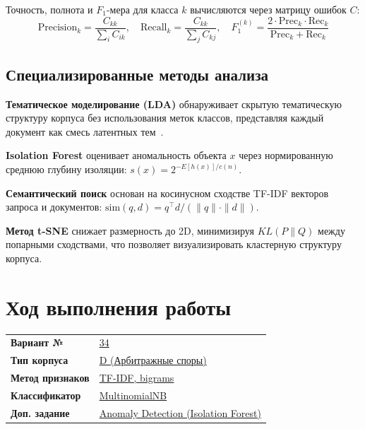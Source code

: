 \documentclass[12pt, a4paper]{report}
\begin{document}
Точность, полнота и $F_1$-мера для класса $k$ вычисляются через матрицу ошибок $C$:
\[
  \text{Precision}_k = \frac{C_{kk}}{\sum_i C_{ik}}, \quad
  \text{Recall}_k    = \frac{C_{kk}}{\sum_j C_{kj}}, \quad
  F_1^{(k)} = \frac{2 \cdot \text{Prec}_k \cdot \text{Rec}_k}{\text{Prec}_k + \text{Rec}_k}
\]

\section{Специализированные методы анализа}

\textbf{Тематическое моделирование (LDA)} обнаруживает скрытую тематическую структуру
корпуса без использования меток классов, представляя каждый документ как смесь
латентных тем~\cite{lec5}.

\textbf{Isolation Forest} оценивает аномальность объекта $x$ через нормированную
среднюю глубину изоляции: $s(x) = 2^{-E[h(x)]/c(n)}$.

\textbf{Семантический поиск} основан на косинусном сходстве TF-IDF векторов запроса
и документов: $\text{sim}(q, d) = q^\top d / (\|q\| \cdot \|d\|)$.

\textbf{Метод t-SNE} снижает размерность до 2D, минимизируя $KL(P \| Q)$ между
попарными сходствами, что позволяет визуализировать кластерную структуру корпуса.

\chapter{Ход выполнения работы}

\begin{tcolorbox}[colback=LightBlue!50, colframe=SteelBlue,
  fonttitle=\sffamily\small\bfseries\color{NavyBlue}, boxrule=1pt,
  left=8pt, right=8pt, top=6pt, bottom=6pt, title={Параметры выполненного варианта}]
  \begin{tabular}{p{5.5cm}p{8cm}}
    {\sffamily\small\bfseries Вариант №} & \underline{34\hspace{6cm}} \\[4pt]
    {\sffamily\small\bfseries Тип корпуса} & \underline{D (Арбитражные споры)\hspace{3.5cm}} \\[4pt]
    {\sffamily\small\bfseries Метод признаков} & \underline{TF-IDF, bigrams\hspace{5cm}} \\[4pt]
    {\sffamily\small\bfseries Классификатор} & \underline{MultinomialNB\hspace{5.5cm}} \\[4pt]
    {\sffamily\small\bfseries Доп. задание} & \underline{Anomaly Detection (Isolation Forest)\hspace{1cm}} \\
  \end{tabular}
\end{tcolorbox}
\end{document}
